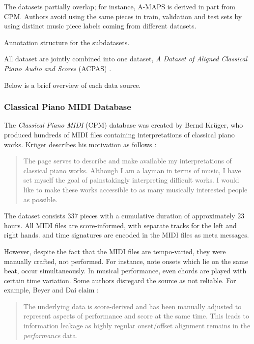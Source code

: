 The datasets partially overlap; for instance, A-MAPS is derived in part from CPM. Authors avoid using the same pieces in train, validation and test sets by using distinct music piece labels coming from different datasets.

\begin{table}[ht!]
\begin{center}

\caption[Annotation structure for the subdatasets.]{Annotation structure for the subdatasets.}
\end{center}
\end{table}

All dataset are jointly combined into one dataset, \emph{A Dataset of Aligned Classical Piano Audio and Scores} (ACPAS) \cite{Liu2021}.

Below is a brief overview of each data source.

\subsubsection{Classical Piano MIDI Database}

The \emph{Classical Piano MIDI} (CPM) database was created by Bernd Krüger, who produced hundreds of MIDI files containing interpretations of classical piano works. Krüger describes his motivation as follows \cite{Krueger1996}:

\begin{quote}The page serves to describe and make available my interpretations of classical piano works. Although I am a layman in terms of music, I have set myself the goal of painstakingly interpreting difficult works. I would like to make these works accessible to as many musically interested people as possible.\end{quote}

The dataset consists 337 pieces with a cumulative duration of approximately $23$ hours. All MIDI files are score-informed, with separate tracks for the left and right hands.  and time signatures are encoded in the MIDI files as meta messages.

However, despite the fact that the MIDI files are tempo-varied, they were manually crafted, not performed. For instance, note onsets which lie on the same beat, occur simultaneously. In musical performance, even chords are played with certain time variation. Some authors disregard the source as not reliable. For example, Beyer and Dai claim \cite{Beyer2024}: \begin{quote}The underlying data is score-derived and has been manually adjusted to represent aspects of performance and score at the same time. This leads to information leakage as highly regular onset/offset alignment remains in the \emph{performance} data.\end{quote}


